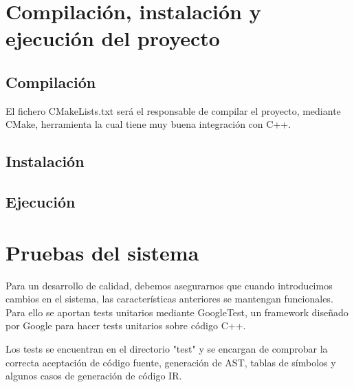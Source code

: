 \section{Compilación, instalación y ejecución del proyecto}
\subsection{Compilación}
El fichero CMakeLists.txt será el responsable de compilar el proyecto, mediante CMake, herramienta la cual tiene muy buena integración con C++. 

\subsection{Instalación}

\subsection{Ejecución}

\section{Pruebas del sistema}
Para un desarrollo de calidad, debemos asegurarnos que cuando introducimos cambios en el sistema, las características anteriores se mantengan funcionales. Para ello se aportan tests unitarios mediante GoogleTest, un framework diseñado por Google para hacer tests unitarios sobre código C++.

Los tests se encuentran en el directorio "test" y se encargan de comprobar la correcta aceptación de código fuente, generación de AST, tablas de símbolos y algunos casos de generación de código IR.